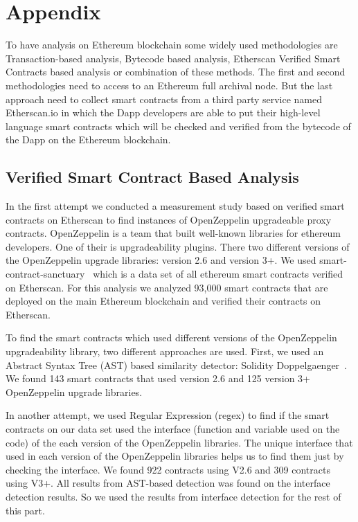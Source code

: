 \section{Appendix}
To have analysis on Ethereum blockchain some widely used methodologies are Transaction-based analysis, Bytecode based analysis, Etherscan Verified Smart Contracts based analysis or combination of these methods. The first and second methodologies need to access to an Ethereum full archival node. But the last approach need to collect smart contracts from a third party service named Etherscan.io in which the Dapp developers are able to put their high-level language smart contracts which will be checked and verified from the bytecode of the Dapp on the Ethereum blockchain.

\subsection{Verified Smart Contract Based Analysis}
In the first attempt we conducted a measurement study based on verified smart contracts on Etherscan to find instances of OpenZeppelin upgradeable proxy contracts. OpenZeppelin is a team that built well-known libraries for ethereum developers. One of their is upgradeability plugins. There two different versions of the OpenZeppelin upgrade libraries: version 2.6 and version 3+. 
We used smart-contract-sanctuary~\cite{smart_contract_sanctuary} which is a data set of all ethereum smart contracts verified on Etherscan. For this analysis we analyzed 93,000 smart contracts that are deployed on the main Ethereum blockchain and verified their contracts on Etherscan. 

To find the smart contracts which used different versions of the OpenZeppelin upgradeability library, two different approaches are used. First, we used an Abstract Syntax Tree (AST) based similarity detector: Solidity Doppelgaenger~\cite{solidity-doppelganger}. We found 143 smart contracts that used version 2.6 and 125 version 3+ OpenZeppelin upgrade libraries. 

In another attempt, we used Regular Expression (regex) to find if the smart contracts on our data set used the interface (function and variable used on the code) of the each version of the OpenZeppelin libraries. The unique interface that used in each version of the OpenZeppelin libraries helps us to find them just by checking the interface. We found 922 contracts using V2.6 and 309 contracts using V3+. All results from AST-based detection was found on the interface detection results. So we used the results from interface detection for the rest of this part.

